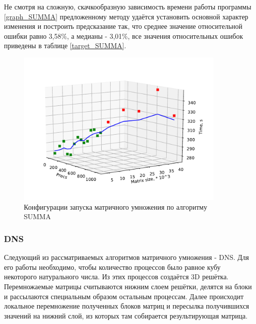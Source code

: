 		Не смотря на сложную, скачкообразную зависимость времени работы программы \eqref{graph_SUMMA} предложенному методу удаётся установить основной характер изменения и построить предсказание так, что среднее значение относительной ошибки равно 3,58\%, а медианы - 3,01\%, все значения относительных ошибок приведены в таблице \eqref{target_SUMMA}.

		\begin{figure}
			\centering
			\includegraphics[width=0.9\textwidth]{./images/graph_SUMMA}
			\caption{Конфигурации запуска матричного умножения по алгоритму SUMMA}
			\label{graph_SUMMA}
		\end{figure}

		\subsubsection{DNS}
			Следующий из рассматриваемых алгоритмов матричного умножения - DNS. Для его работы необходимо, чтобы количество процессов было равное кубу некоторого натурального числа. Из этих процессов создаётся 3D решётка. Перемножаемые матрицы считываются нижним слоем решётки, делятся на блоки и рассылаются специальным образом остальным процессам. Далее происходит локальное перемножение полученных блоков матриц и пересылка получившихся значений на нижний слой, из которых там собирается результирующая матрица.

